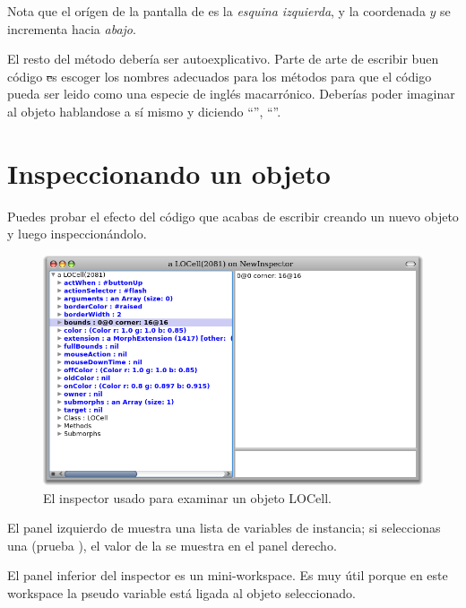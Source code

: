 \documentclass[a4paper,10pt,twoside]{book}
\begin{document}
Nota que el or\'igen de la pantalla de \pharo es la \emph{esquina izquierda}, y la coordenada $y$ se incrementa hacia \emph{abajo}.

El resto del m\'etodo deber\'ia ser autoexplicativo.
Parte de arte de escribir buen c\'odigo \st es escoger los nombres adecuados para los m\'etodos para que el c\'odigo pueda ser leido como una especie de ingl\'es macarr\'onico. 
Deber\'ias poder imaginar al objeto hablandose a s\'i mismo y diciendo ``'', ``''.

\section{Inspeccionando un objeto}

Puedes probar el efecto del c\'odigo que acabas de escribir creando un nuevo objeto  y luego inspeccion\'andolo. 


\begin{figure}[htbp]
   \centering
   \includegraphics[width=\textwidth]{LOCellInspector} 
   \caption{El inspector usado para examinar un objeto LOCell.}
\end{figure}

El panel izquierdo de  muestra una lista de variables de instancia; si seleccionas una (prueba \mbox{}), el valor de la  se muestra en el panel derecho. 

El panel inferior del inspector es un mini-workspace. Es muy \'util porque en este workspace la pseudo variable \self est\'a ligada al objeto seleccionado.
\end{document}
